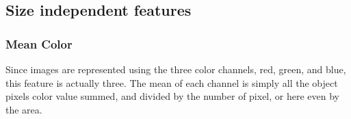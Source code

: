 \begin{comment}
\begin{figure}[H]
    \centering
    \captionsetup[subfigure]{justification=centering}
    \begin{subfigure}[b]{0.49\textwidth}
        \centering
        
        \caption{}
        \label{}
    \end{subfigure}
    \begin{subfigure}[b]{0.49\textwidth}
        \centering
        
		\caption{}
		\label{}
    \end{subfigure}
    \begin{subfigure}[b]{0.49\textwidth}
        \centering
        
        \caption{}
        \label{}
    \end{subfigure}
    \begin{subfigure}[b]{0.49\textwidth}
        \centering
        
		\caption{}
		\label{}
    \end{subfigure}
    \begin{subfigure}[b]{0.49\textwidth}
        \centering
        
        \caption{}
        \label{}
    \end{subfigure}
    \begin{subfigure}[b]{0.49\textwidth}
        \centering
        
		\caption{}
		\label{}
    \end{subfigure}
    \caption{}
    \label{}
\end{figure}
\end{comment}

\subsection{Size independent features}
\subsubsection{Mean Color}

Since images are represented using the three color channels, red, green, and blue, this feature is actually three. The mean of each channel is simply all the object pixels color value summed, and divided by the number of pixel, or here even by the area.

